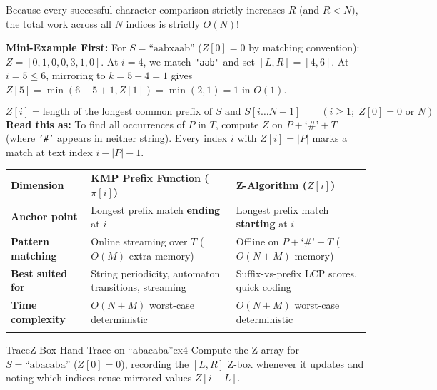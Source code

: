 \documentclass[11pt,a4paper]{article}
\theoremstyle{definition}
\newcommand{\examplebeat}{\textbf{\color{primaryblue}Mini-Example First:} }
\begin{document}
Because every successful character comparison strictly increases $R$ (and $R < N$), the total work across all $N$ indices is strictly $O(N)$!

\examplebeat For $S = \text{``aabxaab''}$ ($Z[0] = 0$ by matching convention): $Z = [0, 1, 0, 0, 3, 1, 0]$. At $i = 4$, we match \texttt{"aab"} and set $[L, R] = [4, 6]$. At $i = 5 \le 6$, mirroring to $k = 5 - 4 = 1$ gives $Z[5] = \min(6 - 5 + 1, Z[1]) = \min(2, 1) = 1$ in $O(1)$.

\begin{formulabox}
\[
    Z[i] = \text{length of the longest common prefix of } S \text{ and } S[i \dots N - 1]
    \qquad (i \ge 1;\; Z[0] = 0 \text{ or } N)
\]
\textbf{Read this as:} To find all occurrences of $P$ in $T$, compute $Z$ on $P + \text{`\#'} + T$ (where \texttt{'\#'} appears in neither string). Every index $i$ with $Z[i] = |P|$ marks a match at text index $i - |P| - 1$.
\end{formulabox}

\begingroup\small{}
\begin{tabularx}{\textwidth}{>{\raggedright\arraybackslash\bfseries}p{3.0cm} >{\raggedright\arraybackslash}X >{\raggedright\arraybackslash}X}
\arrayrulecolor{primaryblue}\toprule[1.2pt]
\rowcolor{primaryblue!10}
\textcolor{primaryblue}{\textbf{Dimension}} & \textcolor{primaryblue}{\textbf{KMP Prefix Function ($\pi[i]$)}} & \textcolor{primaryblue}{\textbf{Z-Algorithm ($Z[i]$)}} \\
\arrayrulecolor{codeframe}\midrule[0.6pt]
Anchor point & Longest prefix match \textbf{ending} at $i$ & Longest prefix match \textbf{starting} at $i$ \\
Pattern matching & Online streaming over $T$ ($O(M)$ extra memory) & Offline on $P + \text{`\#'} + T$ ($O(N + M)$ memory) \\
Best suited for & String periodicity, automaton transitions, streaming & Suffix-vs-prefix LCP scores, quick coding \\
Time complexity & $O(N + M)$ worst-case deterministic & $O(N + M)$ worst-case deterministic \\
\arrayrulecolor{primaryblue}\bottomrule[1.2pt]
\end{tabularx}\endgroup

\begin{tryitbox}{Trace}{Z-Box Hand Trace on ``abacaba''}{ex4}
Compute the Z-array for $S = \text{``abacaba''}$ ($Z[0] = 0$), recording the $[L, R]$ Z-box whenever it updates and noting which indices reuse mirrored values $Z[i - L]$.
\end{tryitbox}
\end{document}
